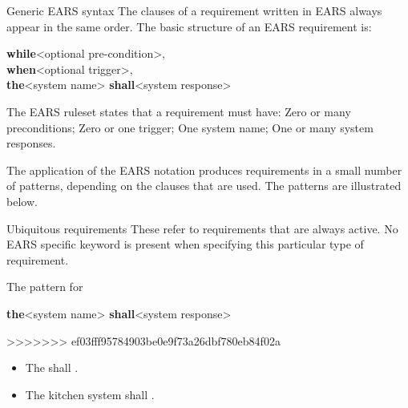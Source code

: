 \documentclass[aspectratio=169]{beamer}
\begin{document}
\begin{frame}[fragile]



\newcommand{\mkw}[2]{\textcolor{#2}{\textbf{#1}}\xspace}
\newcommand{\ewhile}{\mkw{while}{pink!75!black}}
\newcommand{\ewhere}{\mkw{where}{pink!75!black}}
\newcommand{\eif}{\mkw{if}{pink!75!black}}
\newcommand{\ethen}{\mkw{then}{pink!75!black}}
\newcommand{\ewhen}{\mkw{when}{blue!75!black}}
\newcommand{\ethe}{\mkw{the}{purple!75!black}}
\newcommand{\eshall}{\mkw{shall}{red!75!black}}

\begin{slide}{Generic EARS syntax}
    The clauses of a requirement written in EARS always appear in the same order. The basic structure of an EARS requirement is:

    \begin{block}{}\ttfamily
    \ewhile <optional pre-condition>, \\
     \ewhen <optional trigger>, \\
      \ethe <system name> \eshall <system response> 
    \end{block}

  The EARS ruleset states that a requirement must have: Zero or many preconditions; Zero or one trigger; One system name; One or many system responses.

The application of the EARS notation produces requirements in a small number of patterns, depending on the clauses that are used. The patterns are illustrated below.
\end{slide}

\begin{slide}{Ubiquitous requirements}
    These refer to requirements that are always active. No EARS specific keyword is present when specifying this particular type of requirement.
    
    The pattern for 
    \begin{block}{}
    \ethe <system name> \eshall <system response>  
    \end{block}
>>>>>>> ef03fff95784903be0e9f73a26dbf780eb84f02a
  \begin{example}
    \begin{itemize}
      \item The {\color{red}{mobile phone}} shall {\color{blue}{have a mass of less than $x$ grams}}.
      \item The {\color{red}kitchen system} shall {\color{blue}{have an input hatch}}.
    \end{itemize}
  \end{example}
\end{slide}



\end{frame}
\end{document}
